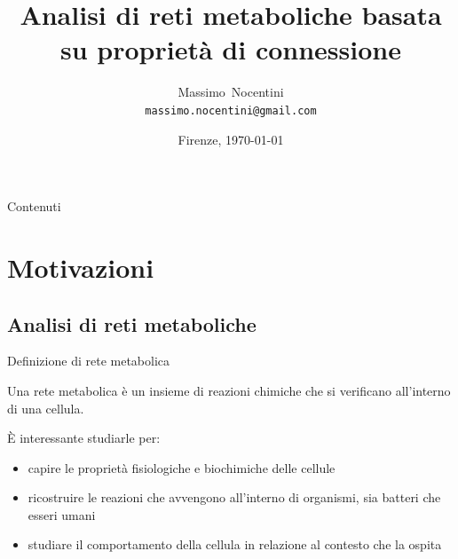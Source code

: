 \documentclass{beamer}
\title[Analisi di reti metaboliche] {Analisi di reti metaboliche
  basata su propriet\`a di connessione}
\author[Massimo Nocentini] %
{Massimo~Nocentini\\\texttt{massimo.nocentini@gmail.com}}
\institute[UniversitaStudiFirenze] %
 { Universit\`a degli Studi di Firenze }
\date[Tesi20120222] %
{Firenze, \today}
\begin{document}
\begin{frame}[plain]
  \titlepage
\end{frame}

\begin{frame}{Contenuti}
  \tableofcontents[pausesections]
\end{frame}





\section{Motivazioni}

\subsection{Analisi di reti metaboliche}

\begin{frame}{Definizione di rete metabolica}
  \begin{definition}
    Una rete metabolica \`e un insieme di reazioni chimiche che si
    verificano all'interno di una cellula.
  \end{definition}
  \`E interessante studiarle per:
  \begin{itemize}
  \item capire le propriet\`a fisiologiche e biochimiche delle
    cellule
  \item ricostruire le reazioni che avvengono all'interno di
    organismi, sia batteri che esseri umani
  \item studiare il comportamento della cellula in relazione al
    contesto che la ospita
  \end{itemize}
\end{frame}
\end{document}
